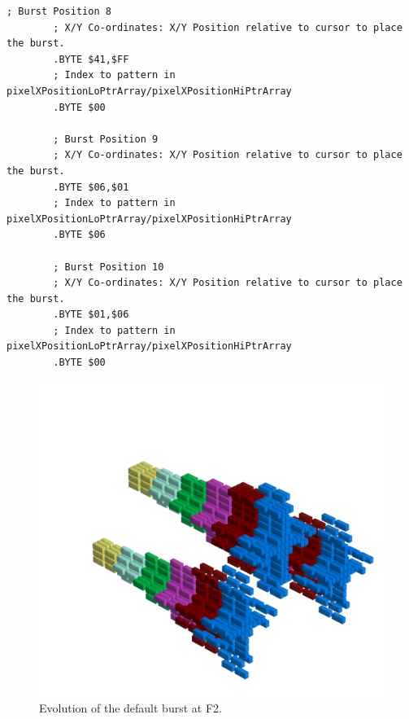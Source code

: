 \begin{lstlisting}[basicstyle=\tiny,caption=Source code for the F1 Burst.]
        ; Burst Position 8
        ; X/Y Co-ordinates: X/Y Position relative to cursor to place the burst.
        .BYTE $41,$FF
        ; Index to pattern in pixelXPositionLoPtrArray/pixelXPositionHiPtrArray
        .BYTE $00

        ; Burst Position 9
        ; X/Y Co-ordinates: X/Y Position relative to cursor to place the burst.
        .BYTE $06,$01
        ; Index to pattern in pixelXPositionLoPtrArray/pixelXPositionHiPtrArray
        .BYTE $06

        ; Burst Position 10
        ; X/Y Co-ordinates: X/Y Position relative to cursor to place the burst.
        .BYTE $01,$06
        ; Index to pattern in pixelXPositionLoPtrArray/pixelXPositionHiPtrArray
        .BYTE $00
\end{lstlisting}

\clearpage
\begin{figure}[H]
    \centering
    \begin{adjustbox}{width=12cm,center}
      \includegraphics[width=12cm]{src/patterns/bursts/pattern1-45.png}%
    \end{adjustbox}
\caption{Evolution of the default burst at F2.}
\end{figure}
\clearpage

